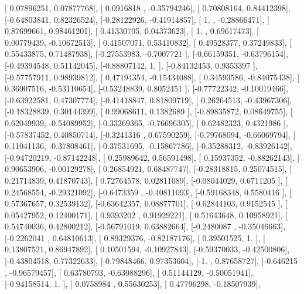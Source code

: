 \documentclass{article}
\begin{document}
       [ 0.07896251,  0.07877768],
       [ 0.0916818 , -0.35794246],
       [ 0.70808164,  0.84412398],
       [-0.64803841,  0.82326524],
       [-0.28122926, -0.41914857],
       [ 1.        , -0.28866471],
       [ 0.87699661,  0.98461201],
       [ 0.41330705,  0.04373623],
       [ 1.        ,  0.69617473],
       [ 0.00779439, -0.10672513],
       [ 0.41507071,  0.53410832],
       [ 0.49528377,  0.37249833],
       [ 0.55433875,  0.71487938],
       [-0.27553983, -0.7007721 ],
       [-0.66159351, -0.63796154],
       [-0.49394548,  0.51142045],
       [-0.88807142,  1.        ],
       [-0.84132453,  0.9353397 ],
       [-0.57757911,  0.98939812],
       [ 0.47194354, -0.15434088],
       [ 0.34593586, -0.84075438],
       [ 0.36907516, -0.53110654],
       [-0.53248839,  0.8052451 ],
       [-0.77722342, -0.10019466],
       [-0.63922581,  0.47307774],
       [-0.41418847,  0.81809719],
       [ 0.26264513, -0.43967306],
       [-0.18328839,  0.30144399],
       [ 0.99068611,  0.1382689 ],
       [-0.89835872,  0.08649755],
       [ 0.62049939, -0.54089952],
       [-0.33269365, -0.76696305],
       [ 0.62482323,  0.4321986 ],
       [-0.57837452,  0.40850714],
       [-0.3241316 ,  0.67590259],
       [-0.79768094, -0.66069794],
       [ 0.11041136, -0.37808461],
       [-0.37531695, -0.15867786],
       [-0.35288312, -0.83926142],
       [-0.94720219, -0.87142248],
       [ 0.25989642,  0.56591498],
       [ 0.15937352, -0.88262143],
       [ 0.90653906, -0.00129278],
       [ 0.26854921,  0.68487747],
       [-0.28318815,  0.25074515],
       [ 0.21714839,  0.41870743],
       [ 0.72764578,  0.02811089],
       [-0.08044029,  0.6711205 ],
       [ 0.24568554, -0.29321092],
       [-0.6473359 , -0.40811093],
       [-0.59168348,  0.5580416 ],
       [ 0.57367657,  0.32539132],
       [-0.63642357,  0.08877701],
       [ 0.62844103,  0.9152545 ],
       [ 0.05427952,  0.12400171],
       [ 0.9393202 ,  0.91929221],
       [ 0.51643648,  0.10958921],
       [ 0.54740036,  0.42800212],
       [-0.56791019,  0.63882664],
       [-0.2480087 , -0.35046663],
       [-0.2262041 ,  0.64810613],
       [ 0.89329376, -0.82187176],
       [ 0.39501525,  1.        ],
       [ 0.13807521,  0.86947892],
       [ 0.10501594, -0.10927843],
       [-0.59370033, -0.42500806],
       [-0.43804518,  0.77322633],
       [-0.79848466,  0.97353604],
       [-1.        ,  0.87658727],
       [-0.646215  , -0.96579457],
       [ 0.63780793, -0.63088296],
       [ 0.51144129, -0.50051941],
       [-0.94158514,  1.        ],
       [ 0.0758984 ,  0.55630253],
       [ 0.47796298, -0.18507939],
\end{document}
